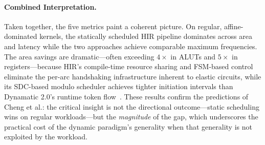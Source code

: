 \documentclass[sigplan,10pt,review,nonacm]{acmart}
\begin{document}
\paragraph{Combined Interpretation.}
Taken together, the five metrics paint a coherent picture. On
regular, affine-dominated kernels, the statically scheduled HIR pipeline
dominates across area and latency while the two approaches achieve
comparable maximum frequencies. The area savings are dramatic---often
exceeding $4\times$ in ALUTs and $5\times$ in registers---because HIR's
compile-time resource sharing and FSM-based control eliminate the per-arc
handshaking infrastructure inherent to elastic circuits, while its
SDC-based modulo scheduler achieves tighter initiation intervals than
Dynamatic 2.0's runtime token flow~\cite{9378784}. These results confirm the
predictions of Cheng et al.: the critical insight is not the directional
outcome---static scheduling wins on regular workloads---but the
\emph{magnitude} of the gap, which underscores the practical cost of the
dynamic paradigm's generality when that generality is not exploited by
the workload.
\end{document}

